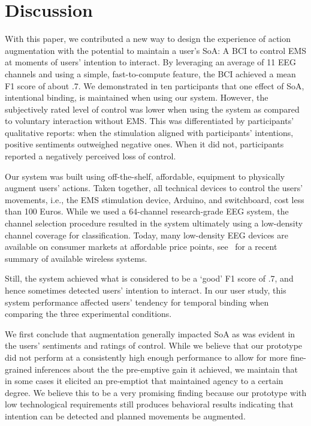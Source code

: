\section{Discussion}
With this paper, we contributed a new way to design the experience of action augmentation with the potential to maintain a user's SoA: A BCI to control EMS at moments of users' intention to interact. By leveraging an average of 11 EEG channels and using a simple, fast-to-compute feature, the BCI achieved a mean F1 score of about .7. We demonstrated in ten participants that one effect of SoA, intentional binding, is maintained when using our system. However, the subjectively rated level of control was lower when using the system as compared to voluntary interaction without EMS. This was differentiated by participants' qualitative reports: when the stimulation aligned with participants' intentions, positive sentiments outweighed negative ones. When it did not, participants reported a negatively perceived loss of control.

Our system was built using off-the-shelf, affordable, equipment to physically augment users' actions. Taken together, all technical devices to control the users' movements, i.e., the EMS stimulation device, Arduino, and switchboard, cost less than 100 Euros. While we used a 64-channel research-grade EEG system, the channel selection procedure resulted in the system ultimately using a low-density channel coverage for classification. Today, many low-density EEG devices are available on consumer markets at affordable price points, see~\citet{Niso2023-ce} for a recent summary of available wireless systems. 

Still, the system achieved what is considered to be a `good' F1 score of .7, and hence sometimes detected users' intention to interact. In our user study, this system performance affected users' tendency for temporal binding when comparing the three experimental conditions. 

We first conclude that augmentation generally impacted SoA as was evident in the users' sentiments and ratings of control. While we believe that our prototype did not perform at a consistently high enough performance to allow for more fine-grained inferences about the the pre-emptive gain it achieved, we maintain that in some cases it elicited an pre-emptiot that maintained agency to a certain degree. We believe this to be a very promising finding because our prototype with low technological requirements still produces behavioral results indicating that intention can be detected and planned movements be augmented.

